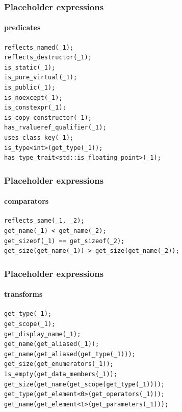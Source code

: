 \documentclass[compress,table,xcolor=table]{beamer}
\begin{document}
\begin{frame}[fragile]
  \frametitle{Placeholder expressions}
  \framesubtitle{predicates}
  \begin{lstlisting}[language=c++2x,basicstyle=\small\ttfamily]
reflects_named(_1);
reflects_destructor(_1);
is_static(_1);
is_pure_virtual(_1);
is_public(_1);
is_noexcept(_1);
is_constexpr(_1);
is_copy_constructor(_1);
has_rvalueref_qualifier(_1);
uses_class_key(_1);
is_type<int>(get_type(_1));
has_type_trait<std::is_floating_point>(_1);
  \end{lstlisting}
\end{frame}
\begin{frame}[fragile]
  \frametitle{Placeholder expressions}
  \framesubtitle{comparators}
  \begin{lstlisting}[language=c++2x,basicstyle=\small\ttfamily]
reflects_same(_1, _2);
get_name(_1) < get_name(_2);
get_sizeof(_1) == get_sizeof(_2);
get_size(get_name(_1)) > get_size(get_name(_2));
  \end{lstlisting}
\end{frame}
\begin{frame}[fragile]
  \frametitle{Placeholder expressions}
  \framesubtitle{transforms}
  \begin{lstlisting}[language=c++2x,basicstyle=\small\ttfamily]
get_type(_1);
get_scope(_1);
get_display_name(_1);
get_name(get_aliased(_1));
get_name(get_aliased(get_type(_1)));
get_size(get_enumerators(_1));
is_empty(get_data_members(_1));
get_size(get_name(get_scope(get_type(_1))));
get_type(get_element<0>(get_operators(_1)));
get_name(get_element<1>(get_parameters(_1)));
  \end{lstlisting}
\end{frame}
\end{document}
